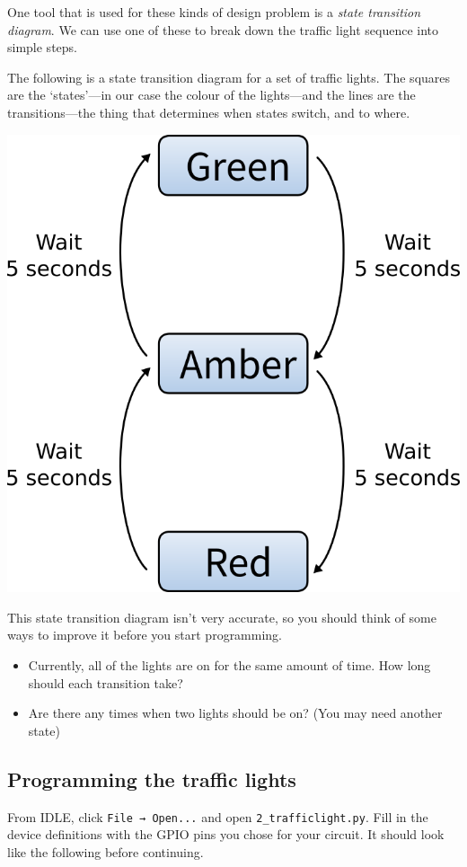 		One tool that is used for these kinds of design problem is a \textit{state transition diagram}. We can use one of these to break down the traffic light sequence into simple steps.
		
		The following is a state transition diagram for a set of traffic lights. The squares are the `states'---in our case the colour of the lights---and the lines are the transitions---the thing that determines when states switch, and to where.
		
		\begin{center}
			\includegraphics[width=0.6\linewidth]{McrRaspJam/015_GPIOZero/2_trafficlight/transition}
		\end{center}
		
		This state transition diagram isn't very accurate, so you should think of some ways to improve it before you start programming.
		
		\begin{itemize}[noitemsep]
			\item Currently, all of the lights are on for the same amount of time. How long should each transition take?
			\item Are there any times when two lights should be on? (You may need another state)
		\end{itemize}
	
	\subsection*{Programming the traffic lights}
	
		From IDLE, click \mbox{\texttt{File → Open...}} and open \texttt{2\_trafficlight.py}. Fill in the device definitions with the GPIO pins you chose for your circuit. It should look like the following before continuing.
	
